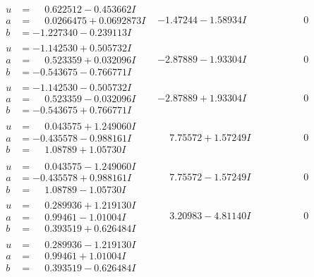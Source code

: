 \documentclass[1p]{elsarticle_modified}
\theoremstyle{definition}
\begin{document}
$$\begin{array}{c|c|c}
\begin{aligned}
u &= \phantom{-}0.622512 - 0.453662 I \\
a &= \phantom{-}0.0266475 + 0.0692873 I \\
b &= -1.227340 - 0.239113 I\end{aligned}
 & -1.47244 - 1.58934 I & \phantom{-0.000000 } 0 \\ \hline\begin{aligned}
u &= -1.142530 + 0.505732 I \\
a &= \phantom{-}0.523359 + 0.032096 I \\
b &= -0.543675 - 0.766771 I\end{aligned}
 & -2.87889 - 1.93304 I & \phantom{-0.000000 } 0 \\ \hline\begin{aligned}
u &= -1.142530 - 0.505732 I \\
a &= \phantom{-}0.523359 - 0.032096 I \\
b &= -0.543675 + 0.766771 I\end{aligned}
 & -2.87889 + 1.93304 I & \phantom{-0.000000 } 0 \\ \hline\begin{aligned}
u &= \phantom{-}0.043575 + 1.249060 I \\
a &= -0.435578 - 0.988161 I \\
b &= \phantom{-}1.08789 + 1.05730 I\end{aligned}
 & \phantom{-}7.75572 + 1.57249 I & \phantom{-0.000000 } 0 \\ \hline\begin{aligned}
u &= \phantom{-}0.043575 - 1.249060 I \\
a &= -0.435578 + 0.988161 I \\
b &= \phantom{-}1.08789 - 1.05730 I\end{aligned}
 & \phantom{-}7.75572 - 1.57249 I & \phantom{-0.000000 } 0 \\ \hline\begin{aligned}
u &= \phantom{-}0.289936 + 1.219130 I \\
a &= \phantom{-}0.99461 - 1.01004 I \\
b &= \phantom{-}0.393519 + 0.626484 I\end{aligned}
 & \phantom{-}3.20983 - 4.81140 I & \phantom{-0.000000 } 0 \\ \hline\begin{aligned}
u &= \phantom{-}0.289936 - 1.219130 I \\
a &= \phantom{-}0.99461 + 1.01004 I \\
b &= \phantom{-}0.393519 - 0.626484 I\end{aligned}

\end{array}$$
\end{document}
